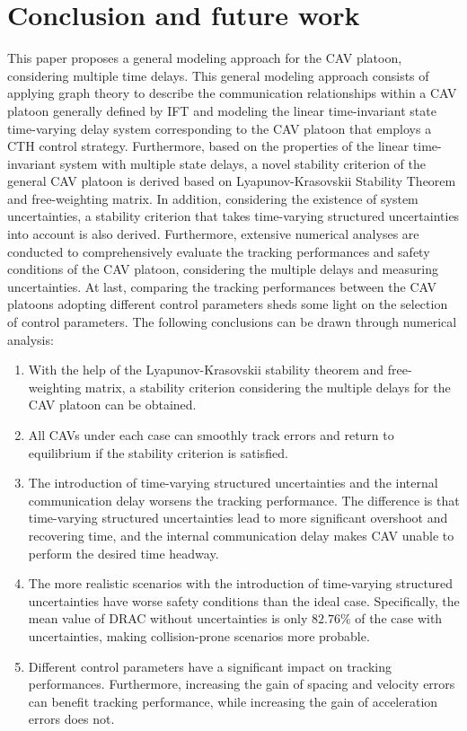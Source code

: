 \documentclass[journal]{IEEEtran}
\begin{document}
\section{Conclusion and future work}
\label{Section 6}

This paper proposes a general modeling approach for the CAV platoon, considering multiple time delays. This general modeling approach consists of applying graph theory to describe the communication relationships within a CAV platoon generally defined by IFT and modeling the linear time-invariant state time-varying delay system corresponding to the CAV platoon that employs a CTH control strategy. Furthermore, based on the properties of the linear time-invariant system with multiple state delays, a novel stability criterion of the general CAV platoon is derived based on Lyapunov-Krasovskii Stability Theorem and free-weighting matrix. In addition, considering the existence of system uncertainties, a stability criterion that takes time-varying structured uncertainties into account is also derived. Furthermore, extensive numerical analyses are conducted to comprehensively evaluate the tracking performances and safety conditions of the CAV platoon, considering the multiple delays and measuring uncertainties. At last, comparing the tracking performances between the CAV platoons adopting different control parameters sheds some light on the selection of control parameters.
The following conclusions can be drawn through numerical analysis:
\begin{enumerate}

  \item With the help of the Lyapunov-Krasovskii stability theorem and free-weighting matrix, a stability criterion considering the multiple delays for the CAV platoon can be obtained.
  \item All CAVs under each case can smoothly track errors and return to equilibrium if the stability criterion is satisfied.
  \item  The introduction of time-varying structured uncertainties and the internal communication delay worsens the tracking performance. The difference is that time-varying structured uncertainties lead to more significant overshoot and recovering time, and the internal communication delay makes CAV unable to perform the desired time headway.
  \item The more realistic scenarios with the introduction of time-varying structured uncertainties have worse safety conditions than the ideal case. Specifically, the mean value of DRAC without uncertainties is only $82.76\%$ of the case with uncertainties, making collision-prone scenarios more probable.
  \item Different control parameters have a significant impact on tracking performances. Furthermore, increasing the gain of spacing and velocity errors can benefit tracking performance, while increasing the gain of acceleration errors does not.

\end{enumerate}
\end{document}
